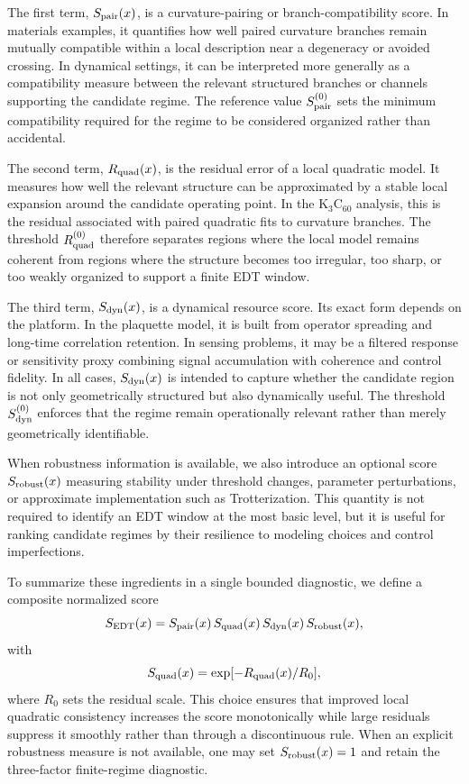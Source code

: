 \documentclass[twocolumn,10pt]{article}
\begin{document}
The first term, $S_{\rm pair}(x)$, is a curvature-pairing or branch-compatibility score. In materials examples, it quantifies how well paired curvature branches remain mutually compatible within a local description near a degeneracy or avoided crossing. In dynamical settings, it can be interpreted more generally as a compatibility measure between the relevant structured branches or channels supporting the candidate regime. The reference value $S_{\rm pair}^{(0)}$ sets the minimum compatibility required for the regime to be considered organized rather than accidental.

The second term, $R_{\rm quad}(x)$, is the residual error of a local quadratic model. It measures how well the relevant structure can be approximated by a stable local expansion around the candidate operating point. In the K$_3$C$_{60}$ analysis, this is the residual associated with paired quadratic fits to curvature branches. The threshold $R_{\rm quad}^{(0)}$ therefore separates regions where the local model remains coherent from regions where the structure becomes too irregular, too sharp, or too weakly organized to support a finite EDT window.

The third term, $S_{\rm dyn}(x)$, is a dynamical resource score. Its exact form depends on the platform. In the plaquette model, it is built from operator spreading and long-time correlation retention. In sensing problems, it may be a filtered response or sensitivity proxy combining signal accumulation with coherence and control fidelity. In all cases, $S_{\rm dyn}(x)$ is intended to capture whether the candidate region is not only geometrically structured but also dynamically useful. The threshold $S_{\rm dyn}^{(0)}$ enforces that the regime remain operationally relevant rather than merely geometrically identifiable.

When robustness information is available, we also introduce an optional score $S_{\rm robust}(x)$ measuring stability under threshold changes, parameter perturbations, or approximate implementation such as Trotterization. This quantity is not required to identify an EDT window at the most basic level, but it is useful for ranking candidate regimes by their resilience to modeling choices and control imperfections.

To summarize these ingredients in a single bounded diagnostic, we define a composite normalized score
\begin{equation}
S_{\rm EDT}(x) = S_{\rm pair}(x)\,S_{\rm quad}(x)\,S_{\rm dyn}(x)\,S_{\rm robust}(x),
\end{equation}
with
\begin{equation}
S_{\rm quad}(x) = \exp[-R_{\rm quad}(x)/R_0],
\end{equation}
where $R_0$ sets the residual scale. This choice ensures that improved local quadratic consistency increases the score monotonically while large residuals suppress it smoothly rather than through a discontinuous rule. When an explicit robustness measure is not available, one may set $S_{\rm robust}(x)=1$ and retain the three-factor finite-regime diagnostic.
\end{document}
